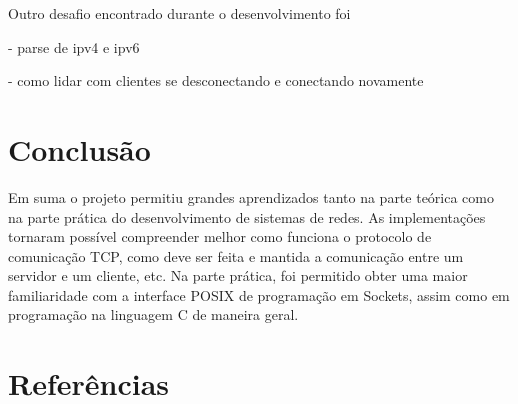 \documentclass{article}
\begin{document}
Outro desafio encontrado durante o desenvolvimento foi 

- parse de ipv4 e ipv6

- como lidar com clientes se desconectando e conectando novamente



\section{Conclusão}

Em suma o projeto permitiu grandes aprendizados tanto na parte teórica como na
parte prática do desenvolvimento de sistemas de redes. As implementações
tornaram
possível compreender melhor como funciona o protocolo de comunicação TCP, como
deve ser feita e mantida a comunicação entre um servidor e um cliente, etc. Na
parte prática, foi permitido obter uma maior familiaridade
com a interface POSIX de programação em Sockets, assim como em programação na
linguagem C de maneira geral.

\section{Referências}
\end{document}
